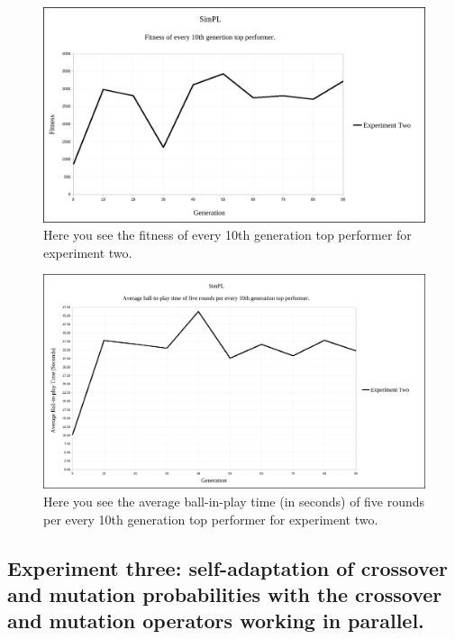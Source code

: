 \documentclass[a4paper,10pt]{article}
\begin{document}
\begin{figure}[H]  
  \centering
  \includegraphics[width=1\textwidth]{figures/exp2_10_tops.png}
  \caption{Here you see the fitness of every 10th generation top performer for experiment two.}
  \label{fig:exp2_10_tops}
\end{figure}

\begin{figure}[H]  
  \centering
  \includegraphics[width=1\textwidth]{figures/exp2_10_tops_times.png}
  \caption{Here you see the average ball-in-play time (in seconds) of five rounds per every 10th generation top performer for experiment two.}
  \label{fig:exp2_10_tops_times}
\end{figure}

\subsection{Experiment three: self-adaptation of crossover and mutation probabilities with the crossover and mutation operators working in parallel.}
\end{document}
